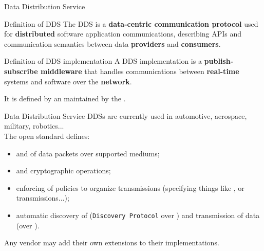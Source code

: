 \begin{frame}{Data Distribution Service}
  \begin{block}{Definition of DDS}
    The DDS is a \textbf{data-centric communication protocol} used for \textbf{distributed} software application communications, describing APIs and communication semantics between data \textbf{providers} and \textbf{consumers}.
  \end{block}
	\begin{block}{Definition of DDS implementation}
		A DDS implementation is a \textbf{publish-subscribe middleware} that handles communications between \textbf{real-time} systems and software over the \textbf{network}.
	\end{block}
  It is defined by an \href{https://www.omg.org/spec/DDS/About-DDS/}{} maintained by the .
\end{frame}
\begin{frame}{Data Distribution Service}
	DDSs are currently used in automotive, aerospace, military, robotics...\\
  \bigskip
	The open standard defines:
	\begin{itemize}
		\item {} and  of data packets over supported mediums;
		\item {} and cryptographic operations;
		\item enforcing of  policies to organize transmissions (specifying things like ,  or  transmissions...);
		\item automatic discovery of  (\texttt{Discovery Protocol} over ) and transmission of data (over ).
	\end{itemize}
  \bigskip
  Any vendor may add their own extensions to their implementations.
\end{frame}
